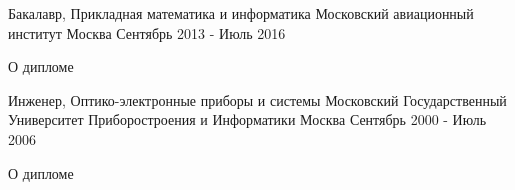 

\begin{cventries}

  \cventry
    {Бакалавр, Прикладная математика и информатика} %
    {Московский авиационный институт} %
    {Москва} %
    {Сентябрь 2013 - Июль 2016} %
    {
      \begin{cvitems} %
        \item {О дипломе}
      \end{cvitems}
    }
  \cventry
    {Инженер, Оптико-электронные приборы и системы} %
    {Московский Государственный Университет Приборостроения и Информатики} %
    {Москва} %
    {Сентябрь 2000 - Июль 2006} %
    {
      \begin{cvitems} %
        \item {О дипломе}
      \end{cvitems}
    }

\end{cventries}
